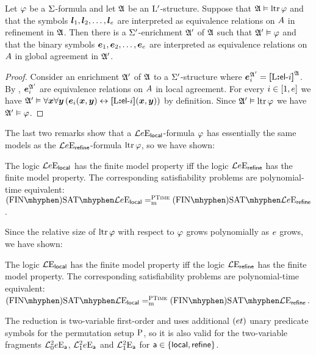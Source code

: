 \begin{remark}
Let $\varphi$ be a $\mathrm{\Sigma}$-formula and let $\mathfrak{A}$ be an ${{\mathrm{L}}'}$-structure.
Suppose that $\mathfrak{A} \vDash \operatorname{ltr}\varphi$ and that the symbols
$\bm{l}_{1}, \bm{l}_{2}, \dots, \bm{l}_{e}$ are interpreted as equivalence relations on
$A$ in refinement in $\mathfrak{A}$.
Then there is a $\mathrm{\Sigma'}$-enrichment $\mathfrak{A'}$ of $\mathfrak{A}$ such that
$\mathfrak{A'} \vDash \varphi$ and that the binary symbols
$\bm{e}_{1}, \bm{e}_{2}, \dots, \bm{e}_{e}$
are interpreted as equivalence relations on $A$ in global agreement in
$\mathfrak{A'}$.
\end{remark}
\begin{proof}
Consider an enrichment $\mathfrak{A'}$ of $\mathfrak{A}$ to a $\mathrm{\Sigma'}$-structure where
$\bm{e}_{i}^{\mathfrak{A'}} = {\bm{[}{\mathrm{L}}\mathord{\bm{:}}\mathsf{el}{\hbox{-}}i\bm{]}}^{\mathfrak{A}}$.
By , $\bm{e}_{i}^{\mathfrak{A'}}$ are equivalence
relations on $A$ in local agreement. 
For every $i \in [1,e]$ we have
$\mathfrak{A'} \vDash \forall\bm{x}\forall\bm{y} \left(\bm{e}_{i}(\bm{x},\bm{y}) \leftrightarrow
{\bm{[}{\mathrm{L}}\mathord{\bm{:}}\mathsf{el}{\hbox{-}}i\bm{]}}(\bm{x},\bm{y})\right)$ by definition.
Since $\mathfrak{A'} \vDash \operatorname{ltr}\varphi$ we have $\mathfrak{A'} \vDash \varphi$.
\end{proof}

The last two remarks show that a $\mathcal{L}{e}\mathrm{E}_{\mathsf{local}}$-formula $\varphi$
has essentially the same models as the $\mathcal{L}{e}\mathrm{E}_{\mathsf{refine}}$-formula
$\operatorname{ltr}\varphi$, so we have shown:

\begin{proposition}\label{prop:local-to-refine-n}
The logic $\mathcal{L}{e}\mathrm{E}_{\mathsf{local}}$ has the finite model property iff
the logic $\mathcal{L}{e}\mathrm{E}_{\mathsf{refine}}$ has the finite model property.
The corresponding satisfiability problems are polynomial-time equivalent:
$\FinASat{\Fo\Eea\sze\aglocal} \redeq\cP \FinASat{\Fo\Eea\sze\agrefine}$.
\end{proposition}

Since the relative size of $\operatorname{ltr}\varphi$ with respect to $\varphi$ grows
polynomially as $e$ grows, we have shown:
\begin{proposition}\label{prop:local-to-refine}
The logic $\mathcal{L}{{}}\mathrm{E}_{\mathsf{local}}$ has the finite model property iff
the logic $\mathcal{L}{{}}\mathrm{E}_{\mathsf{refine}}$ has the finite model property.
The corresponding satisfiability problems are polynomial-time equivalent:
$\FinASat{\Fo\Eea\nosze\aglocal} \redeq\cP \FinASat{\Fo\Eea\nosze\agrefine}$.
\end{proposition}

The reduction is two-variable first-order and uses additional $(et)$
unary predicate symbols for the permutation setup ${\mathrm{P}}$, so it is also valid
for the two-variable fragments $\mathcal{L}^{2}_{0}{e}\mathrm{E}_{\mathsf{a}}$, $\mathcal{L}^{2}_{1}{e}\mathrm{E}_{\mathsf{a}}$
and $\mathcal{L}^{2}_{1}{{}}\mathrm{E}_{\mathsf{a}}$ for $\mathsf{a} \in \left\{\mathsf{local}, \mathsf{refine}\right\}$.
